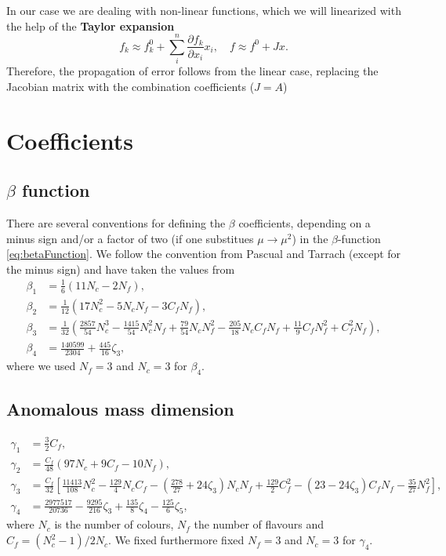 \documentclass[../../index.tex]{subfiles}
\begin{document}
  In our case we are dealing with non-linear functions, which we will
  linearized with the help of the \textbf{Taylor expansion}
  \begin{equation}
    f_k \approx f_k^0 + \sum_i^n \frac{\partial f_k}{\partial x_i} x_i, \quad f \approx f^0 + Jx.
  \end{equation}
  Therefore, the propagation of error follows from the linear case, replacing
  the Jacobian matrix with the combination coefficients ($J = A$)

  \chapter{Coefficients}
  \label{app:coefficients}
  \section{$\beta$ function}
  \label{sec:betaCoefficients}
  There are several conventions for defining the $\beta$ coefficients, depending
  on a minus sign and/or a factor of two (if one substitues $\mu \to \mu^2$) in
  the $\beta$-function \ref{eq:betaFunction}. We follow the convention from
  Pascual and Tarrach (except for the minus sign) and have taken the values from
  \cite{Boito2011}
  \begin{align}
    \beta_1 &= \frac{1}{6} (11N_c - 2N_f), \\
    \beta_2 &= \frac{1}{12} (17N_c^2 - 5N_cN_f - 3 C_fN_f), \\
    \beta_3 &= \frac{1}{32}\left( \frac{2857}{54}N_c^3 -\frac{1415}{54}N_c^2 N_f + \frac{79}{54} N_c N_f^2 - \frac{205}{18} N_c C_f N_f + \frac{11}{9} C_f N_f^2 + C_f^2 N_f \right), \\
    \beta_4 &= \frac{140599}{2304} + \frac{445}{16}\zeta_3,
  \end{align}
  where we used $N_f=3$ and $N_c=3$ for $\beta_4$.

  \section{Anomalous mass dimension}
  \label{app:gammaCoefficients}
  \begin{align}
    \gamma_1 &= \frac{3}{2}C_f, \\
    \gamma_2 &= \frac{C_f}{48}(97 N_c + 9 C_f - 10N_f), \\
    \gamma_3 &= \frac{C_f}{32}\left[ \frac{11413}{108} N_c^2 - \frac{129}{4} N_cC_f - \left( \frac{278}{27} + 24 \zeta_3 \right) N_c N_f + \frac{129}{2} C_f^2 - (23 - 24 \zeta_3) C_f N_f - \frac{35}{27} N_f^2 \right], \\
    \gamma_4 &= \frac{2977517}{20736} - \frac{9295}{216}\zeta_3 + \frac{135}{8}\zeta_4 - \frac{125}{6}\zeta_5,
  \end{align}
  where $N_c$ is the number of colours, $N_f$ the number of flavours and
  $C_f=(N_c^2-1)/2N_c$. We fixed furthermore fixed
  $N_f=3$ and $N_c=3$ for $\gamma_4$.
\end{document}
